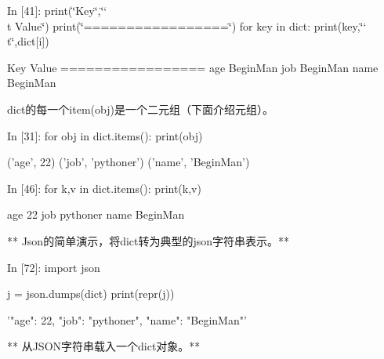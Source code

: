 \documentclass[letterpaper,10pt,english]{sphinxmanual}
\def\PYGZbs{\char`\\}
\def\PYGZdq{\char`\"}
\begin{document}
\begin{OriginalVerbatim}[commandchars=\\\{\}]
\textcolor{nbsphinxin}{In [41]: }print(\PYGZdq{}Key\PYGZdq{},\PYGZdq{}\PYGZbs{}t Value\PYGZdq{})
         print(\PYGZdq{}=================\PYGZdq{})
         for key in dict:
             print(key,\PYGZdq{}\PYGZbs{}t\PYGZdq{},dict[i])
\end{OriginalVerbatim}
\begin{OriginalVerbatim}[commandchars=\\\{\}]
Key      Value
=================
age      BeginMan
job      BeginMan
name     BeginMan
\end{OriginalVerbatim}
dict的每一个item(obj)是一个二元组（下面介绍元组）。

\begin{OriginalVerbatim}[commandchars=\\\{\}]
\textcolor{nbsphinxin}{In [31]: }for obj in dict.items():
             print(obj)
\end{OriginalVerbatim}
\begin{OriginalVerbatim}[commandchars=\\\{\}]
('age', 22)
('job', 'pythoner')
('name', 'BeginMan')
\end{OriginalVerbatim}
\begin{OriginalVerbatim}[commandchars=\\\{\}]
\textcolor{nbsphinxin}{In [46]: }for k,v in dict.items():
             print(k,v)
\end{OriginalVerbatim}
\begin{OriginalVerbatim}[commandchars=\\\{\}]
age 22
job pythoner
name BeginMan
\end{OriginalVerbatim}
** Json的简单演示，将dict转为典型的json字符串表示。**

\begin{OriginalVerbatim}[commandchars=\\\{\}]
\textcolor{nbsphinxin}{In [72]: }import json
         
         j = json.dumps(dict)
         print(repr(j))
\end{OriginalVerbatim}
\begin{OriginalVerbatim}[commandchars=\\\{\}]
'{"age": 22, "job": "pythoner", "name": "BeginMan"}'
\end{OriginalVerbatim}
** 从JSON字符串载入一个dict对象。**
\end{document}
